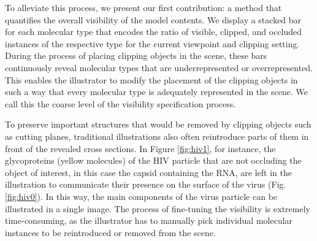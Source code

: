To alleviate this process, we present our first contribution: a method that quantifies the overall visibility of the model contents. We display a stacked bar for each molecular type that encodes the ratio of visible, clipped, and occluded instances of the respective type for the current viewpoint and clipping setting. 
During the process of placing clipping objects in the scene, these bars continuously reveal molecular types that are underrepresented or overrepresented. 
This enables the illustrator to modify the placement of the clipping objects in such a way that every molecular type is adequately represented in the scene. We call this the coarse level of the visibility specification process.

To preserve important structures that would be removed by clipping objects such as cutting planes, traditional illustrations also often reintroduce parts of them in front of the revealed cross sections. 
In Figure \ref{fig:hiv1}, for instance, the glycoproteins (yellow molecules) of the HIV particle that are not occluding the object of interest, in this case the capsid containing the RNA, are left in the illustration to communicate their presence on the surface of the virus (Fig. \ref{fig:hiv0}).
In this way, the main components of the virus particle can be illustrated in a single image.
The process of fine-tuning the visibility is extremely time-consuming, as the illustrator has to manually pick individual molecular instances to be reintroduced or removed from the scene. %

